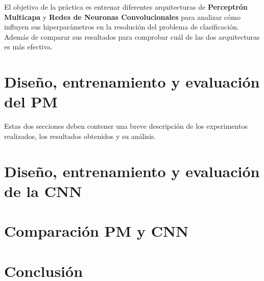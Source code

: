 \documentclass{uc3mpracticas}
\begin{document}
El objetivo de la práctica es entrenar diferentes arquitecturas de \textbf{Perceptrón Multicapa} y \textbf{Redes de Neuronas Convolucionales} para analizar cómo influyen sus hiperparámetros en la resolución del problema de clasificación. Además de comparar sus resultados para comprobar cuál de las dos arquitecturas es más efectiva.



\section{Diseño, entrenamiento y evaluación del PM}

Estas dos secciones deben contener una breve  descripción  de  los  experimentos  realizados,  los  resultados  obtenidos  y  su análisis.

\section{Diseño, entrenamiento y evaluación de la CNN}



\section{Comparación PM y CNN}




\section{Conclusión}
\end{document}
